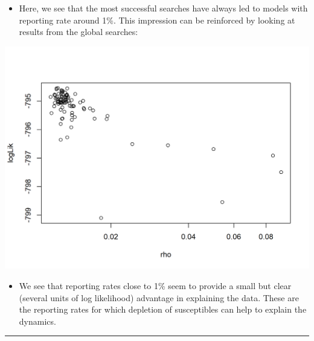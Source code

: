 \documentclass[]{article}
\newenvironment{Shaded}{\begin{snugshade}}{\end{snugshade}}
\newcommand{\KeywordTok}[1]{\textcolor[rgb]{0.13,0.29,0.53}{\textbf{#1}}}
\newcommand{\DataTypeTok}[1]{\textcolor[rgb]{0.13,0.29,0.53}{#1}}
\newcommand{\DecValTok}[1]{\textcolor[rgb]{0.00,0.00,0.81}{#1}}
\newcommand{\StringTok}[1]{\textcolor[rgb]{0.31,0.60,0.02}{#1}}
\newcommand{\OperatorTok}[1]{\textcolor[rgb]{0.81,0.36,0.00}{\textbf{#1}}}
\newcommand{\NormalTok}[1]{#1}
\providecommand{\tightlist}{%
  \setlength{\itemsep}{0pt}\setlength{\parskip}{0pt}}
\begin{document}
\begin{itemize}
\tightlist
\item
  Here, we see that the most successful searches have always led to
  models with reporting rate around 1\%. This impression can be
  reinforced by looking at results from the global searches:
\end{itemize}

\begin{Shaded}
\end{Shaded}

\begin{center}\includegraphics{figure/sp500-global_rho-1} \end{center}

\begin{itemize}
\tightlist
\item
  We see that reporting rates close to 1\% seem to provide a small but
  clear (several units of log likelihood) advantage in explaining the
  data. These are the reporting rates for which depletion of
  susceptibles can help to explain the dynamics.
\end{itemize}

\begin{center}\rule{0.5\linewidth}{\linethickness}\end{center}
\end{document}
